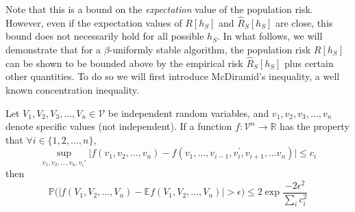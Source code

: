 \documentclass{article}
\begin{document}
 








Note that this is a bound on the  \textit{expectation} value of the population risk. However, even if the expectation values of $R[h_S]$ and $\hat{R}_S[h_S]$ are close, this bound does not necessarily hold for all possible $h_S$. 
In what follows, we will demonstrate that for a $\beta$-uniformly stable algorithm, the population risk  $R[h_S]$ can be shown to be bounded above by the empirical risk $\hat{R}_S[h_S]$ plus certain other quantities. To do so we will first introduce McDiramid's inequality, a well known concentration inequality.

\begin{thm}
Let $V_1, V_2, V_3, \dots , V_n \in \mathcal{V}$ be independent random variables, and $v_1, v_2,v_3,\dots,v_n$ denote specific values (not independent). If a function $f: \mathcal{V}^n \to \mathbb{R}$ has the property that $\forall i \in \{1, 2, \dots, n\}$, 
\[
	\sup_{v_1, v_2, \dots, v_n, v_i{'}}{\biggl|f(v_1, v_2, \dots, v_n) - f(v_1, \dots,v_{i-1}, v_i^{'}, v_{i+1}, \dots v_n)\biggr|} \leq c_i
\]
then
\[
    \mathbb{P}\biggl(\bigl|f(V_1, V_2, \dots , V_n) - \mathbb{E}f(V_1, V_2, \dots , V_n)\bigr|>\epsilon\biggr) \leq 2 \exp{\frac{-2 \epsilon^2}{\sum_{i}{c_{i}^2}}}
\]
\end{thm}
\end{document}
